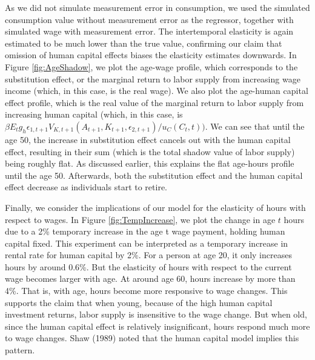 \documentclass{article}
\begin{document}
        As we did not simulate measurement error in consumption, we used the simulated consumption value without measurement error as the regressor, together with simulated wage with measurement error. The intertemporal elasticity is again estimated to be much lower than the true value, confirming our claim that omission of human capital effects biases the elasticity estimates downwards. In Figure \ref{fig:AgeShadow}, we plot the age-wage profile, which corresponds to the substitution effect, or the marginal return to labor supply from increasing wage income (which, in this case, is the real wage). We also plot the age-human capital effect profile, which is the real value of the marginal return to labor supply from increasing human capital (which, in this case, is $\beta E_t g_h \epsilon_{1,t+1} V_{K, t+1}(A_{t+1}, K_{t+1}, \epsilon_{2,t+1})/u_C(C_t, t))$. We can see that until the age 50, the increase in substitution effect cancels out with the human capital effect, resulting in their sum (which is the total shadow value of labor supply) being roughly flat. As discussed earlier, this explains the flat age-hours profile until the age 50. Afterwards, both the substitution effect and the human capital effect decrease as individuals start to retire.\par
        
        
         Finally, we consider the implications of our model for the elasticity of hours with respect to wages. In Figure \ref{fig:TempIncrease}, we plot the change in age $t$ hours due to a 2\% temporary increase in the age t wage payment, holding human capital fixed. This experiment can be interpreted as a temporary increase in rental rate for human capital by 2\%. For a person at age 20, it only increases hours by around 0.6\%. But the elasticity of hours with respect to the current wage becomes larger with age. At around age 60, hours increase by more than 4\%. That is, with age, hours become more responsive to wage changes. This supports the claim that when young, because of the high human capital investment returns, labor supply is insensitive to the wage change. But when old, since the human capital effect is relatively insignificant, hours respond much more to wage changes. Shaw (1989) noted that the human capital model implies this pattern.
\end{document}
